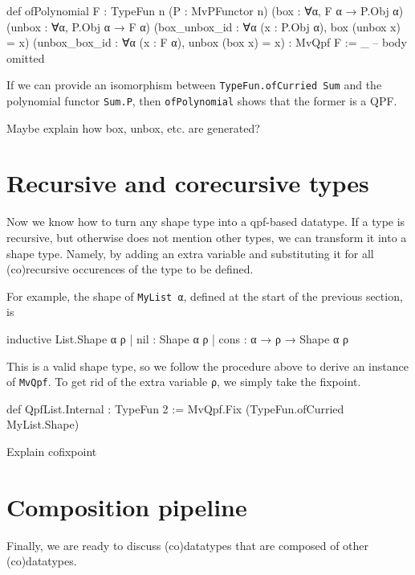\documentclass[titlepage]{report}
\newenvironment{todo}{%
\definecolor{shadecolor}{HTML}{F8E0E0}%
\begin{shaded}%
\begin{trivlist}                         
    \item[\hskip \labelsep {\bfseries Todo:}]}{\end{trivlist}\end{shaded}}
\begin{document}
\begin{leancode}
    def ofPolynomial {F : TypeFun n} 
                     (P : MvPFunctor n) 
                     (box    : ∀{α}, F α → P.Obj α) 
                     (unbox  : ∀{α}, P.Obj α → F α) 
                     (box_unbox_id : ∀{α} (x : P.Obj α), box (unbox x) = x)
                     (unbox_box_id : ∀{α} (x : F α), unbox (box x) = x)
                  : MvQpf F
        := _ -- body omitted
\end{leancode}

If we can provide an isomorphism between \texttt{TypeFun.ofCurried Sum} and the polynomial functor \texttt{Sum.P}, 
then \texttt{ofPolynomial} shows that the former is a QPF.

\begin{todo}
    Maybe explain how box, unbox, etc. are generated?
\end{todo}






\section{Recursive and corecursive types}
Now we know how to turn any shape type into a qpf-based datatype.
If a type is recursive, but otherwise does not mention other types, we can transform it into a shape
type.
Namely, by adding an extra variable and substituting it for all (co)recursive occurences of the type
to be defined.

For example, the shape of \texttt{MyList α}, defined at the start of the previous section, is
\begin{leancode}
    inductive List.Shape α ρ
      | nil  : Shape α ρ
      | cons : α → ρ → Shape α ρ
\end{leancode}
This is a valid shape type, so we follow the procedure above to derive an instance of \texttt{MvQpf}.
To get rid of the extra variable \texttt{ρ}, we simply take the fixpoint.
\begin{leancode}
    def QpfList.Internal : TypeFun 2 
        := MvQpf.Fix (TypeFun.ofCurried MyList.Shape)

\end{leancode}

\begin{todo}
    Explain cofixpoint
\end{todo}



\section{Composition pipeline}
Finally, we are ready to discuss (co)datatypes that are composed of other (co)datatypes.
\end{document}
